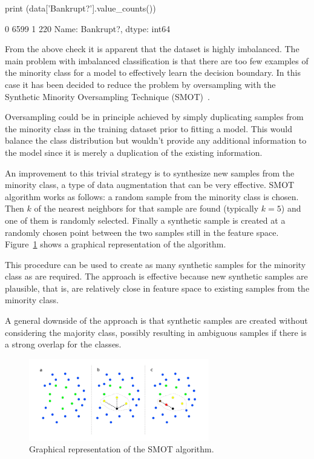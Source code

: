 \begin{ipythonnon}
print (data['Bankrupt?'].value_counts())
\end{ipythonnon}
\begin{ioutput}
0    6599
1     220
Name: Bankrupt?, dtype: int64
\end{ioutput}

From the above check it is apparent that the dataset is highly imbalanced. The main problem with imbalanced classification is that there are too few examples of the minority class for a model to effectively learn the decision boundary. In this case it has been decided to reduce the problem by oversampling with the Synthetic Minority Oversampling Technique (SMOT)~\cite{bib:smot}. 

\begin{attention}
Oversampling could be in principle achieved by simply duplicating samples from the minority class in the training dataset prior to fitting a model. This would balance the class distribution but wouldn't provide any additional information to the model since it is merely a duplication of the existing information.
	
An improvement to this trivial strategy is to synthesize new samples from the minority class, a type of data augmentation that can be very effective.
SMOT algorithm works as follows: a random sample from the minority class is chosen. Then $k$ of the nearest neighbors for that sample are found (typically $k=5$) and one of them is randomly selected. Finally a synthetic sample is created at a randomly chosen point between the two samples still in the feature space.
Figure~\ref{fig:smote} shows a graphical representation of the algorithm.

This procedure can be used to create as many synthetic samples for the minority class as are required. 
The approach is effective because new synthetic samples are plausible, that is, are relatively close in feature space to existing samples from the minority class.

A general downside of the approach is that synthetic samples are created without considering the majority class, possibly resulting in ambiguous samples if there is a strong overlap for the classes.
\end{attention}

\begin{figure}[htb]
\centering
\includegraphics[width=0.7\textwidth]{figures/smote}
\caption{Graphical representation of the SMOT algorithm.}
\label{fig:smote}
\end{figure}

